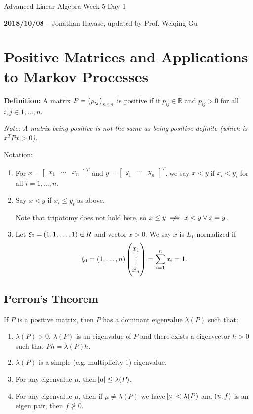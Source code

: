 \documentclass{article}
\newcommand{\m}[1]{\begin{bmatrix} #1 \end{bmatrix}}
\newcommand{\RR}{\mathbb{R}}
\begin{document}
\begin{center}
  \Large Advanced Linear Algebra Week 5 Day 1
  \normalsize

  \textbf{2018/10/08} -- Jonathan Hayase, updated by Prof. Weiqing Gu
\end{center}

\section{Positive Matrices and Applications to Markov Processes}

\textbf{Definition:} A matrix \(P = \del{p_{ij}}_{n \times n}\) is positive if if \(p_{ij} \in \RR\) and \(p_{ij} > 0\) for all \(i, j \in 1, \dots, n\).

\textit{Note: A matrix being positive is not the same as being positive definite (which is \(x^TPx> 0\)).}

Notation:
\begin{enumerate}
\item For \(x = \m{x_1& \cdots & x_n}^T\) and \(y = \m{y_1 & \cdots & y_n}^T\), we say \(x < y\) if \(x_i < y_i\) for all \(i = 1, \dots, n\).

\item Say \(x < y\) if \(x_i \leq y_i\) as above.

  Note that tripotomy does not hold here, so \(x \leq y \centernot\implies x < y \lor x = y \).

\item Let \(\xi_0 = \del{1, 1, \dots, 1} \in R\) and vector \(x> 0\).
  We say  \(x\) is \(L_1\)-normalized if
  \[\xi_0 = \del{1, \dots, n}\begin{pmatrix}x_1\\\vdots\\x_n\end{pmatrix} = \sum_{i=1}^n x_i =1.\]
\end{enumerate}

\subsection{Perron's Theorem}

If \(P\) is a positive matrix, then \(P\) has a dominant eigenvalue \(\lambda(P)\) such that:
\begin{enumerate}
\item \(\lambda(P) > 0\), \(\lambda(P)\) is an eigenvalue of \(P\) and there exists a eigenvector \(h > 0\) such that \(Ph = \lambda(P)h\).
\item \(\lambda(P)\) is a simple (e.g. multiplicity 1) eigenvalue.
\item For any eigenvalue \(\mu\), then \(\abs{\mu} \leq \lambda(P)\).
\item For any eigenvalue \(\mu\), then if \(\mu \neq \lambda(P)\) we have \(\abs{\mu} < \lambda(P)\) and \(\del{u, f}\) is an eigen pair, then \(f \not\geq 0\).
\end{enumerate}
\end{document}
